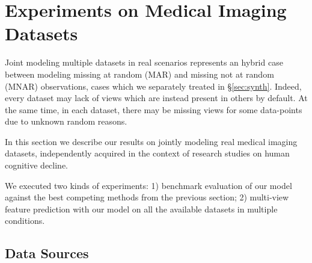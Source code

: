 \section{Experiments on Medical Imaging Datasets}
\label{sec:real}

% 
% 
% 

Joint modeling multiple datasets in real scenarios represents an hybrid case between modeling missing at random (MAR) and missing not at random (MNAR) observations, cases which we separately treated in \S\ref{sec:synth}.
Indeed, every dataset may lack of views which are instead present in others by default.
At the same time, in each dataset, there may be missing views for some data-points due to unknown random reasons.

In this section we describe our results on jointly modeling real medical imaging datasets, independently acquired in the context of research studies on human cognitive decline.

We executed two kinds of experiments:
1) benchmark evaluation of our model against the best competing methods from the previous section;
2) multi-view feature prediction with our model on all the available datasets in multiple conditions.

\subsection{Data Sources}
\label{ssec:datasets}

